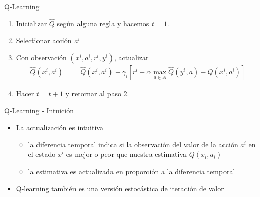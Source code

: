 \documentclass[handout]{beamer}
\begin{document}
\begin{frame}{Q-Learning}
\begin{enumerate}
\item Inicializar $\hat Q$ según alguna regla y hacemos $t=1$.
\item Selectionar acción $a^i$
\item Con observación $(x^i,a^i,r^i,y^i)$, actualizar
{\small
$$
\begin{array}{ccl}
\hat Q(x^i,a^i) & = & \hat Q(x^i,a^i) + \gamma_i\left[ r^i +\alpha \max\limits_{a \in A}\hat Q(y^i,a)-\hat Q(x^i,a^i)\right] 
\end{array}
$$}
\item Hacer $t = t+1$ y retornar al paso 2.
\end{enumerate}  
\end{frame}

\begin{frame}{Q-Learning - Intuición}
\begin{itemize}
\item<3-> La actualización es intuitiva
\begin{itemize}
\item<4-> la diferencia temporal indica si la observación del valor de la acción $a^i$ en el estado $x^i$  es mejor o peor que nuestra estimativa $Q(x_i,a_i)$
\item<5-> la estimativa es actualizada en proporción a la diferencia temporal 
\end{itemize}
\item<6-> Q-learning también es una versión estocástica de iteración de valor
\end{itemize}
\end{frame}
\end{document}
